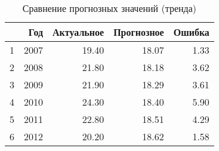 \begin{table}[ht]
\centering
\begin{tabular}{rrrrr}
  \hline
 & Год & Актуальное & Прогнозное & Ошибка \\ 
  \hline
1 & 2007 & 19.40 & 18.07 & 1.33 \\ 
  2 & 2008 & 21.80 & 18.18 & 3.62 \\ 
  3 & 2009 & 21.90 & 18.29 & 3.61 \\ 
  4 & 2010 & 24.30 & 18.40 & 5.90 \\ 
  5 & 2011 & 22.80 & 18.51 & 4.29 \\ 
  6 & 2012 & 20.20 & 18.62 & 1.58 \\ 
   \hline
\end{tabular}
\caption{Сравнение прогнозных значений (тренда)} 
\label{table:prediction_trend}
\end{table}
